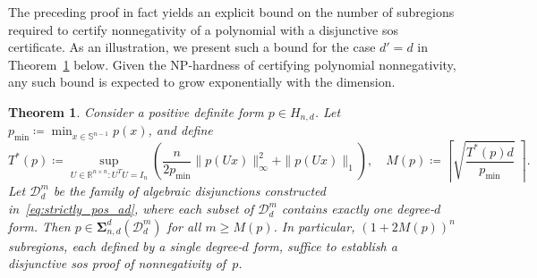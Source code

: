 \documentclass[12pt]{article}
\newcommand{\reals}{\mathbb{R}}
\newcommand{\DiSOS}{\mathbf{\Sigma}}
\newcommand{\defeq}{\coloneq}
\newcommand{\mbS}{\mathbb{S}}
\newcommand{\mcD}{\mathcal{D}}
\newtheorem{theorem}{Theorem}%
\theoremstyle{remark}
\begin{document}
The preceding proof in fact yields an explicit bound on the number of subregions required to certify nonnegativity of a polynomial with a disjunctive sos certificate. As an illustration, we present such a bound for the case $d'=d$ in Theorem~\ref{thm:num_ad} below. Given the NP-hardness of certifying polynomial nonnegativity, any such bound is expected to grow exponentially with the dimension.

\begin{theorem}\label{thm:num_ad}
Consider a positive definite form $p\in H_{n,d}$. Let $p_{\min}\defeq\min_{x\in\mbS^{n-1}} p(x)$, and define
 \begin{equation}\label{eq:thm_counting}
T^*(p)\defeq \sup_{U\in\reals^{n\times n}:U^TU=I_n}\left( \frac{n}{2p_{\min}}\|p(Ux)\|_{\infty}^2 + \|p(Ux)\|_1\right),\quad
M(p)\defeq \left\lceil \sqrt{\frac{T^*(p)d}{p_{\min}}}\;\right\rceil.
\end{equation}
Let $\mcD_d^m$ be the family of algebraic disjunctions constructed in~\eqref{eq:strictly_pos_ad}, where each subset of $\mcD_d^m$ contains exactly one degree-$d$ form. Then $p\in\DiSOS_{n,d}^d(\mcD_d^m)$ for all $m\ge M(p)$. In particular, $\left(1+2 M(p)\right)^n$ subregions, each defined by a single degree-$d$ form, suffice to establish a disjunctive sos proof of nonnegativity of~$p$.
\end{theorem}
\end{document}
